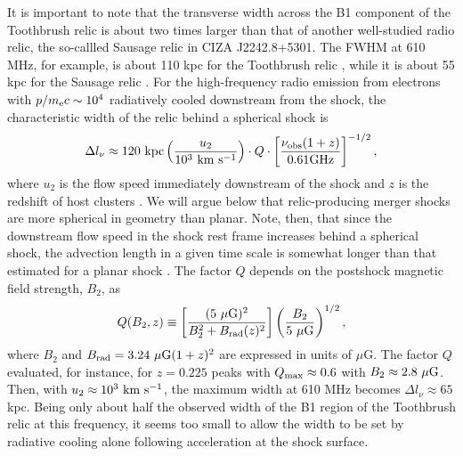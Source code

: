 \documentclass[twocolumn]{aastex61}
\def\kms{~{\rm km~s^{-1}}}
\def\muG{~{\mu\rm G}}
\begin{document}
It is important to note that the transverse width across the B1 component of the Toothbrush relic is about two times larger than that of another well-studied radio relic,
the so-callled Sausage relic in CIZA J2242.8+5301. The FWHM at 610 MHz, for example, is about 110 kpc for the Toothbrush relic \citep{vanweeren16},
while it is about 55 kpc for the Sausage relic \citep{vanweeren10}.
For the high-frequency radio emission 
from electrons with $p/m_{\rm e}c\sim 10^4$ radiatively cooled downstream from the shock,
the characteristic width of the relic behind a spherical shock is
\begin{eqnarray}
\Delta l_{\nu}
\approx 120\ {\rm kpc} \left( {u_2 \over 10^3 \kms}\right) \cdot Q \cdot
\left[{{\nu_{\rm obs}(1+z) \over {0.61{\rm GHz}}} }\right]^{-1/2},
\label{lwidth}
\end{eqnarray}
where $u_2$ is the flow speed immediately downstream of the shock and $z$ is the redshift of host clusters \citep{kang16b}.
We will argue below that relic-producing merger shocks are more spherical in geometry than planar.
Note, then, that since the downstream flow speed in the shock rest frame increases behind a spherical shock, the advection length 
in a given time scale is somewhat longer than that estimated for a planar shock \citep{donnert16}.
The factor $Q$ depends on the postshock magnetic field strength, $B_2$, as 
\begin{equation}
Q(B_2,z)\equiv \left[ { {(5\muG)^2} \over {B_2^2+B_{\rm rad}(z)^2}}\right] \left({B_2 \over 5 \muG}\right)^{1/2},
\label{qfactor}
\end{equation}
where $B_2$ and $B_{\rm rad}=3.24\muG(1+z)^2$ are expressed in units of $\mu$G. 
The factor $Q$ evaluated, for instance, for $z=0.225$ peaks with $Q_{\rm max}\approx 0.6$ with $B_2\approx 2.8\muG$. Then, with $u_2\approx 10^3\kms$,
the maximum width at 610 MHz becomes $\Delta l_{\nu}\approx 65$ kpc. 
Being only about half the observed width of the B1 region of the Toothbrush relic at this frequency, 
it seems too small to allow the width to be set by radiative cooling alone following acceleration at the shock surface. 
\end{document}
